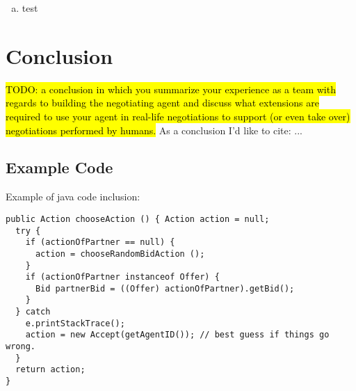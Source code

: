 \documentclass[a4paper,10pt]{article}
\newcommand{\todo}[1] {\hl{TODO: #1}}
\begin{document}
\begin{enumerate}[(a)]

\item{test}

\end{enumerate}

\section{Conclusion}
\label{sec:conclusion}
\todo{a conclusion in which you summarize your experience as a team with regards to building the negotiating agent and discuss what extensions are required to use your agent in real-life negotiations to support (or even take over) negotiations performed by humans.}
As a conclusion I'd like to cite: \cite{baarslag2012decoupling}...

\subsection{Example Code}
Example of java code inclusion:

\begin{lstlisting}
public Action chooseAction () { Action action = null;
  try {
    if (actionOfPartner == null) {
      action = chooseRandomBidAction ();
    }
    if (actionOfPartner instanceof Offer) {
      Bid partnerBid = ((Offer) actionOfPartner).getBid();
    }
  } catch
    e.printStackTrace();
    action = new Accept(getAgentID()); // best guess if things go wrong.
  }
  return action; 
}
\end{lstlisting}



\end{document}
